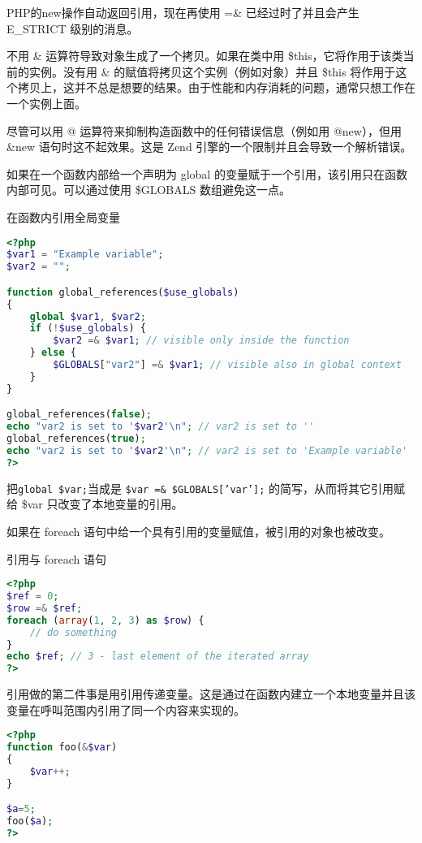 PHP的new操作自动返回引用，现在再使用 =\& 已经过时了并且会产生 E\_STRICT 级别的消息。

不用 \& 运算符导致对象生成了一个拷贝。如果在类中用 \$this，它将作用于该类当前的实例。没有用 \& 的赋值将拷贝这个实例（例如对象）并且 \$this 将作用于这个拷贝上，这并不总是想要的结果。由于性能和内存消耗的问题，通常只想工作在一个实例上面。

尽管可以用 @ 运算符来抑制构造函数中的任何错误信息（例如用 @new），但用 \&new 语句时这不起效果。这是 Zend 引擎的一个限制并且会导致一个解析错误。

如果在一个函数内部给一个声明为 global 的变量赋于一个引用，该引用只在函数内部可见。可以通过使用 \$GLOBALS 数组避免这一点。

\begin{example}
在函数内引用全局变量
\begin{lstlisting}[language=PHP]
<?php
$var1 = "Example variable";
$var2 = "";

function global_references($use_globals)
{
    global $var1, $var2;
    if (!$use_globals) {
        $var2 =& $var1; // visible only inside the function
    } else {
        $GLOBALS["var2"] =& $var1; // visible also in global context
    }
}

global_references(false);
echo "var2 is set to '$var2'\n"; // var2 is set to ''
global_references(true);
echo "var2 is set to '$var2'\n"; // var2 is set to 'Example variable'
?>
\end{lstlisting}
\end{example}

把\texttt{global \$var;}当成是 \texttt{\$var =\& \$GLOBALS['var'];} 的简写，从而将其它引用赋给 \$var 只改变了本地变量的引用。

如果在 foreach 语句中给一个具有引用的变量赋值，被引用的对象也被改变。



\begin{example}
引用与 foreach 语句
\begin{lstlisting}[language=PHP]
<?php
$ref = 0;
$row =& $ref;
foreach (array(1, 2, 3) as $row) {
    // do something
}
echo $ref; // 3 - last element of the iterated array
?>
\end{lstlisting}
\end{example}

引用做的第二件事是用引用传递变量。这是通过在函数内建立一个本地变量并且该变量在呼叫范围内引用了同一个内容来实现的。

\begin{lstlisting}[language=PHP]
<?php
function foo(&$var)
{
    $var++;
}

$a=5;
foo($a);
?>
\end{lstlisting}

